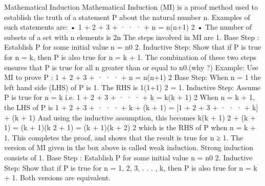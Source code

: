 Mathematical Induction
Mathematical Induction (MI) is a proof method used to establish the truth of a statement
P about the natural number n. Examples of such statements are:
• 1 + 2 + 3 + · · · + n =
n(n+1)
2
• The number of subsets of a set with n elements is 2n
The steps involved in MI are
1. Base Step : Establish P for some initial value n = n0
2. Inductive Step: Show that if P is true for n = k, then P is also true for n = k + 1.
The combination of these two steps ensures that P is true for all n greater than or equal
to n0.(why ?)
Example: Use MI to prove P : 1 + 2 + 3 + · · · + n =
n(n+1)
2
Base Step: When n = 1 the left hand side (LHS) of P is 1. The RHS is 1(1+1)
2 = 1.
Inductive Step: Assume P is true for n = k i.e.
1 + 2 + 3 + · · · + k =
k(k + 1)
2
When n = k + 1, the LHS of P is
1 + 2 + 3 + · · · + k + (k + 1) = [1 + 2 + 3 + · · · + k] + (k + 1)
And using the inductive assumption, this becomes
k(k + 1)
2
+ (k + 1) = (k + 1)(k
2
+ 1) = (k + 1)(k + 2)
2
which is the RHS of P when n = k + 1. This completes the proof, and shows that the
result is true for n ≥ 1.
The version of MI given in the box above is called weak induction. Strong induction
consists of
1. Base Step : Establish P for some initial value n = n0
2. Inductive Step: Show that if P is true for n = 1, 2, 3, . . . , k, then P is also true for
n = k + 1.
Both versions are equivalent.
